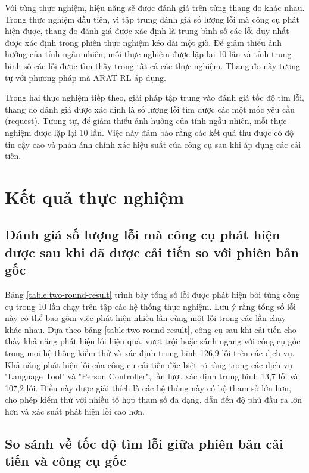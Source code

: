 Với từng thực nghiệm, hiệu năng sẽ được đánh giá trên từng thang đo khác nhau. Trong thực nghiệm đầu tiên, vì tập trung đánh giá số lượng lỗi mà công cụ phát hiện được, thang đo đánh giá được xác định là trung bình số các lỗi duy nhất được xác định trong phiên thực nghiệm kéo dài một giờ. Để giảm thiểu ảnh hưởng của tính ngẫu nhiên, mỗi thực nghiệm được lặp lại 10 lần và tính trung bình số các lỗi được tìm thấy trong tất cả các thực nghiệm. Thang đo này tương tự với phương pháp mà ARAT-RL áp dụng.

Trong hai thực nghiệm tiếp theo, giải pháp tập trung vào đánh giá tốc độ tìm lỗi, thang đo đánh giá được xác định là số lượng lỗi tìm được các một mốc yêu cầu (request). Tương tự, để giảm thiểu ảnh hưởng của tính ngẫu nhiên, mỗi thực nghiệm được lặp lại 10 lần. Việc này đảm bảo rằng các kết quả thu được có độ tin cậy cao và phản ánh chính xác hiệu suất của công cụ sau khi áp dụng các cải tiến.

\section{Kết quả thực nghiệm}
\subsection{Đánh giá số lượng lỗi mà công cụ phát hiện được sau khi đã được cải tiến so với phiên bản gốc}


Bảng \ref{table:two-round-result} trình bày tổng số lỗi được phát hiện bởi từng công cụ trong 10 lần chạy  trên tập các hệ thống thực nghiệm. Lưu ý rằng tổng số lỗi này có thể bao gồm việc phát hiện nhiều lần cùng một lỗi trong các lần chạy khác nhau. Dựa theo bảng \ref{table:two-round-result}, công cụ sau khi cải tiến cho thấy khả năng phát hiện lỗi hiệu quả, vượt trội hoặc sánh ngang với công cụ gốc trong mọi hệ thống kiểm thử và xác định trung bình 126,9 lỗi trên các dịch vụ. Khả năng phát hiện lỗi của công cụ cải tiến đặc biệt rõ ràng trong các dịch vụ "Language Tool" và "Person Controller", lần lượt xác định trung bình 13,7 lỗi và 107,2 lỗi. Điều này được giải thích là các hệ thống này có bộ tham số lớn hơn, cho phép kiểm thử với nhiều tổ hợp tham số đa dạng, dẫn đến độ phủ đầu ra lớn hơn và xác suất phát hiện lỗi cao hơn.

\subsection{So sánh về tốc độ tìm lỗi giữa phiên bản cải tiến và công cụ gốc}

